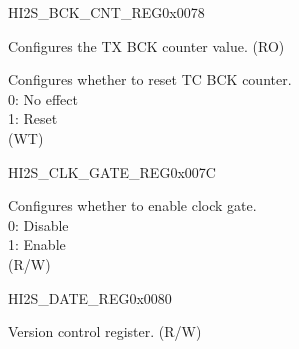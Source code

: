 \begin{register}{H}{I2S\_BCK\_CNT\_REG}{0x0078}\label{regdesc:I2SBCKCNTREG}
%
%
\regnewline%
\begin{regdesc}\begin{reglist}
\label{fielddesc:I2STXBCKCNT}\item [I2S\_TX\_BCK\_CNT] Configures the TX BCK counter value. (RO)
\label{fielddesc:I2STXBCKCNTRST}\item [I2S\_TX\_BCK\_CNT\_RST] Configures whether to reset TC BCK counter. \\
0: No effect\\
1: Reset\\
(WT)
\end{reglist}\end{regdesc}
\end{register}


\begin{register}{H}{I2S\_CLK\_GATE\_REG}{0x007C}\label{regdesc:I2SCLKGATEREG}
%
%
\regnewline%
\begin{regdesc}\begin{reglist}
\label{fielddesc:I2SCLKEN}\item [I2S\_CLK\_EN] Configures whether to enable clock gate. \\
0: Disable\\
1: Enable\\
(R/W)
\end{reglist}\end{regdesc}
\end{register}


\begin{register}{H}{I2S\_DATE\_REG}{0x0080}\label{regdesc:I2SDATEREG}
%
%
\regnewline%
\begin{regdesc}\begin{reglist}
\label{fielddesc:I2SDATE}\item [I2S\_DATE] Version control register. (R/W)
\end{reglist}\end{regdesc}
\end{register}
